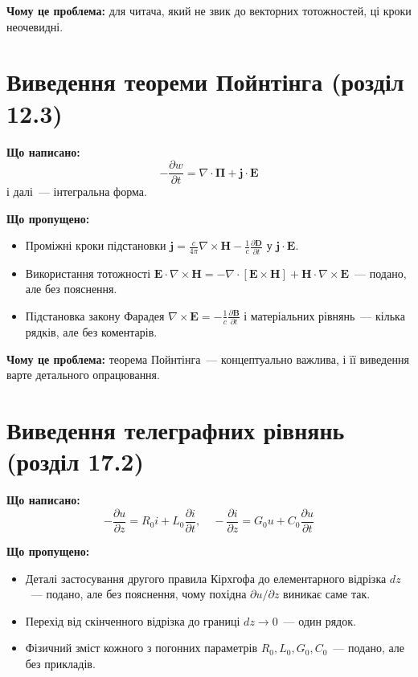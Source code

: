 \documentclass[11pt,a4paper]{article}
\begin{document}
\textbf{Чому це проблема:} для читача, який не звик до векторних тотожностей, ці кроки неочевидні.

\section{Виведення теореми Пойнтінга (розділ 12.3)}

\textbf{Що написано:}
\[
-\frac{\partial w}{\partial t} = \nabla \cdot \boldsymbol{\Pi} + \mathbf{j} \cdot \mathbf{E}
\]
і далі~--- інтегральна форма.

\textbf{Що пропущено:}
\begin{itemize}[nosep]
    \item Проміжні кроки підстановки \(\mathbf{j} = \frac{c}{4\pi} \nabla \times \mathbf{H} - \frac{1}{c} \frac{\partial \mathbf{D}}{\partial t}\) у \(\mathbf{j} \cdot \mathbf{E}\).
    \item Використання тотожності \(\mathbf{E} \cdot \nabla \times \mathbf{H} = -\nabla \cdot [\mathbf{E} \times \mathbf{H}] + \mathbf{H} \cdot \nabla \times \mathbf{E}\)~--- подано, але без пояснення.
    \item Підстановка закону Фарадея \(\nabla \times \mathbf{E} = -\frac{1}{c} \frac{\partial \mathbf{B}}{\partial t}\) і матеріальних рівнянь~--- кілька рядків, але без коментарів.
\end{itemize}

\textbf{Чому це проблема:} теорема Пойнтінга~--- концептуально важлива, і її виведення варте детального опрацювання.

\section{Виведення телеграфних рівнянь (розділ 17.2)}

\textbf{Що написано:}
\[
-\frac{\partial u}{\partial z} = R_0 i + L_0 \frac{\partial i}{\partial t}, \quad -\frac{\partial i}{\partial z} = G_0 u + C_0 \frac{\partial u}{\partial t}
\]

\textbf{Що пропущено:}
\begin{itemize}[nosep]
    \item Деталі застосування другого правила Кірхгофа до елементарного відрізка \(dz\)~--- подано, але без пояснення, чому похідна \(\partial u/\partial z\) виникає саме так.
    \item Перехід від скінченного відрізка до границі \(dz \to 0\)~--- один рядок.
    \item Фізичний зміст кожного з погонних параметрів \(R_0, L_0, G_0, C_0\)~--- подано, але без прикладів.
\end{itemize}
\end{document}
